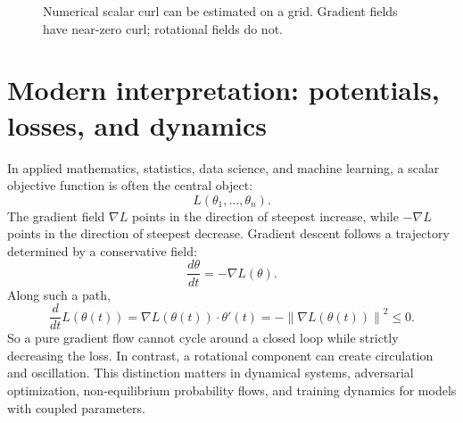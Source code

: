 \documentclass[11pt,oneside]{book}
\newcommand{\norm}[1]{\left\lVert #1\right\rVert}
\newcommand{\grad}{\nabla}
\begin{document}
\begin{figure}[H]
\centering
{}
\caption{Numerical scalar curl can be estimated on a grid. Gradient fields have near-zero curl; rotational fields do not.}
\end{figure}

\section{Modern interpretation: potentials, losses, and dynamics}

In applied mathematics, statistics, data science, and machine learning, a scalar objective function is often the central object:
\[
L(\theta_1,\ldots,\theta_n).
\]
The gradient field $\grad L$ points in the direction of steepest increase, while $-\grad L$ points in the direction of steepest decrease. Gradient descent follows a trajectory determined by a conservative field:
\[
\frac{d\theta}{dt}=-\grad L(\theta).
\]
Along such a path,
\[
\frac{d}{dt}L(\theta(t))=\grad L(\theta(t))\cdot \theta'(t)
=-\norm{\grad L(\theta(t))}^2\le 0.
\]
So a pure gradient flow cannot cycle around a closed loop while strictly decreasing the loss. In contrast, a rotational component can create circulation and oscillation. This distinction matters in dynamical systems, adversarial optimization, non-equilibrium probability flows, and training dynamics for models with coupled parameters.
\end{document}
